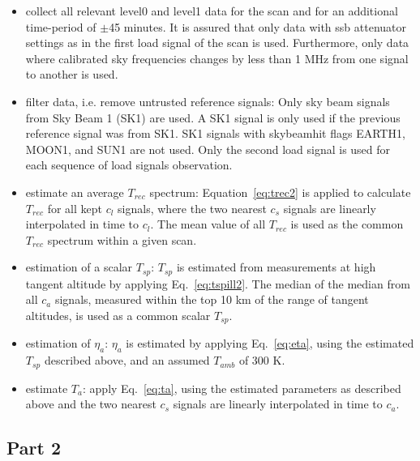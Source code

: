 \begin{itemize}
\item collect all relevant level0 and level1 data for the scan and for an
additional time-period of \(\pm\)45 minutes.
It is assured that only data with ssb attenuator settings
as in the first load signal of the scan is used.
Furthermore, only data where calibrated sky frequencies changes by less
than 1 MHz from one signal to another is used.

\item filter data, i.e. remove untrusted reference signals:\newline
Only sky beam signals from Sky Beam 1 (SK1) are used.
A SK1 signal is only used if the previous
reference signal was from SK1.
SK1 signals with skybeamhit flags EARTH1, MOON1, and SUN1 are not used.
Only the second load signal is used for each sequence of load signals
observation.

\item estimate an average \(T_{rec}\) spectrum:\newline
Equation~\ref{eq:trec2} is applied to calculate \(T_{rec}\)
for all kept \(c_{l}\) signals, where
the two nearest \(c_{s}\) signals are linearly interpolated
in time to \(c_{l}\).
The mean value of all \(T_{rec}\) is used as the
common \(T_{rec}\) spectrum within a given scan.
\item estimation of a scalar \(T_{sp}\):\newline
\(T_{sp}\) is estimated from measurements at high tangent altitude
by applying Eq.~\ref{eq:tspill2}.
The median of the median
from all \(c_{a}\) signals, measured within the top 10 km
of the range of tangent altitudes, is used as a common scalar \(T_{sp}\).
\item estimation of \(\eta_{a}\):\newline
\(\eta_{a}\) is estimated by applying Eq.~\ref{eq:eta},
using the estimated \(T_{sp}\) described above, and an
assumed \(T_{amb}\) of 300 K.
\item estimate \(T_{a}\): \newline
apply Eq.~\ref{eq:ta}, using the estimated parameters as described
above and
the two nearest \(c_{s}\) signals are linearly interpolated
in time to \(c_{a}\).
\end{itemize}



\subsection*{Part 2}

